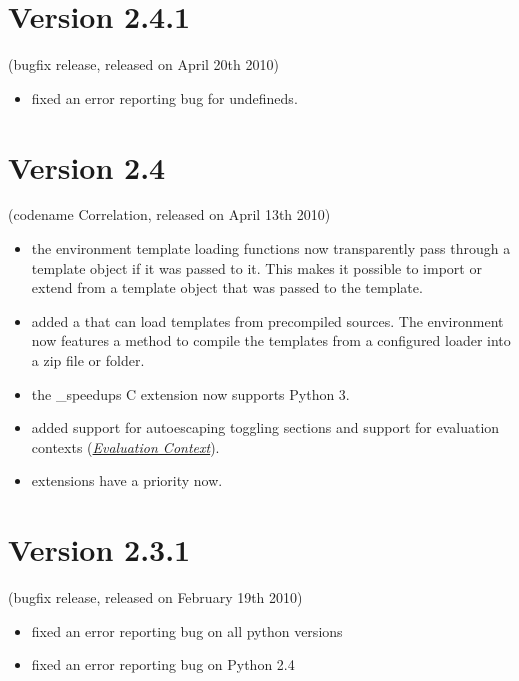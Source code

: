 \documentclass[a4paper,10pt,english]{sphinxmanual}
\begin{document}
\section{Version 2.4.1}
\label{changelog:version-2-4-1}
(bugfix release, released on April 20th 2010)
\begin{itemize}
\item {} 
fixed an error reporting bug for undefineds.

\end{itemize}


\section{Version 2.4}
\label{changelog:version-2-4}
(codename Correlation, released on April 13th 2010)
\begin{itemize}
\item {} 
the environment template loading functions now transparently
pass through a template object if it was passed to it.  This
makes it possible to import or extend from a template object
that was passed to the template.

\item {} 
added a  that can load templates from
precompiled sources.  The environment now features a method
to compile the templates from a configured loader into a zip
file or folder.

\item {} 
the \_speedups C extension now supports Python 3.

\item {} 
added support for autoescaping toggling sections and support
for evaluation contexts ({\hyperref[api:eval-context]{\emph{Evaluation Context}}}).

\item {} 
extensions have a priority now.

\end{itemize}


\section{Version 2.3.1}
\label{changelog:version-2-3-1}
(bugfix release, released on February 19th 2010)
\begin{itemize}
\item {} 
fixed an error reporting bug on all python versions

\item {} 
fixed an error reporting bug on Python 2.4

\end{itemize}
\end{document}
